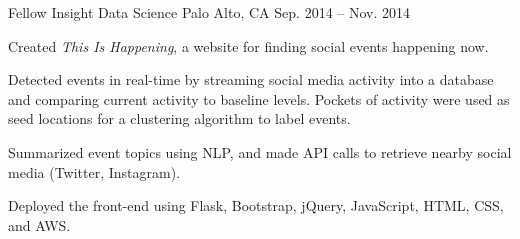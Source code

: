 \begin{cventries}
  \cventry
    {Fellow} %
    {Insight Data Science} %
    {Palo Alto, CA} %
    {Sep. 2014 -- Nov. 2014} %
    {
      \begin{cvitems} %
        \item {Created \textit{This Is Happening}, a website for finding social events happening now.}
        \item {Detected events in real-time by streaming social media activity into a database and comparing current activity to baseline levels.  Pockets of activity were used as seed locations for a clustering algorithm to label events.}
        \item {Summarized event topics using NLP, and made API calls to retrieve nearby social media (Twitter, Instagram).}
        \item {Deployed the front-end using Flask, Bootstrap, jQuery, JavaScript, HTML, CSS, and AWS.}
      \end{cvitems}
    }



\end{cventries}
